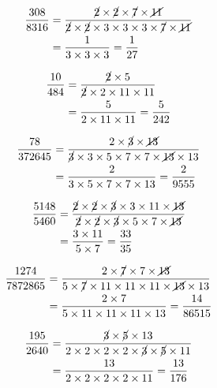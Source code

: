 {{\item\begin{align*}
    \dfrac{308}{8316} &=
    \dfrac{\cancel{2} \times \cancel{2} \times \cancel{7} \times \cancel{11}}
    {\cancel{2} \times \cancel{2} \times 3 \times 3 \times 3 \times \cancel{7} \times \cancel{11}}\\ &=
    \dfrac{1}
    {3 \times 3 \times 3} =
    \dfrac{1}{27}
    \end{align*}

\item\begin{align*}
    \dfrac{10}{484} &=
    \dfrac{\cancel{2} \times 5}
    {\cancel{2} \times 2 \times 11 \times 11}\\ &=
    \dfrac{5}
    {2 \times 11 \times 11} =
    \dfrac{5}{242}
    \end{align*}

\item\begin{align*}
    \dfrac{78}{372645} &=
    \dfrac{2 \times \cancel{3} \times \cancel{13}}
    {\cancel{3} \times 3 \times 5 \times 7 \times 7 \times \cancel{13} \times 13}\\ &=
    \dfrac{2}
    {3 \times 5 \times 7 \times 7 \times 13} =
    \dfrac{2}{9555}
    \end{align*}

\item\begin{align*}
    \dfrac{5148}{5460} &=
    \dfrac{\cancel{2} \times \cancel{2} \times \cancel{3} \times 3 \times 11 \times \cancel{13}}
    {\cancel{2} \times \cancel{2} \times \cancel{3} \times 5 \times 7 \times \cancel{13}}\\ &=
    \dfrac{3 \times 11}
    {5 \times 7} =
    \dfrac{33}{35}
    \end{align*}

\item\begin{align*}
    \dfrac{1274}{7872865} &=
    \dfrac{2 \times \cancel{7} \times 7 \times \cancel{13}}
    {5 \times \cancel{7} \times 11 \times 11 \times 11 \times \cancel{13} \times 13}\\ &=
    \dfrac{2 \times 7}
    {5 \times 11 \times 11 \times 11 \times 13} =
    \dfrac{14}{86515}
    \end{align*}

\item\begin{align*}
    \dfrac{195}{2640} &=
    \dfrac{\cancel{3} \times \cancel{5} \times 13}
    {2 \times 2 \times 2 \times 2 \times \cancel{3} \times \cancel{5} \times 11}\\ &=
    \dfrac{13}
    {2 \times 2 \times 2 \times 2 \times 11} =
    \dfrac{13}{176}
    \end{align*}

}}

